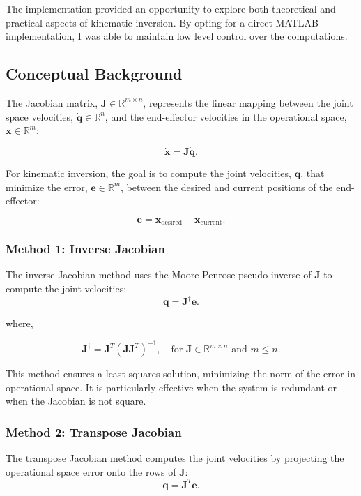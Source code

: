 \documentclass[12pt]{report}
\begin{document}
		The implementation provided an opportunity to explore both theoretical and practical aspects of kinematic inversion. By opting for a direct MATLAB implementation, I was able to maintain low level control over the computations.
	
			\addtocounter{section}{5} 
		\addtocounter{subsection}{0}
		\subsection{Conceptual Background}
The Jacobian matrix, \(\mathbf{J} \in \mathbb{R}^{m \times n}\), represents the linear mapping between the joint space velocities, \(\dot{\mathbf{q}} \in \mathbb{R}^n\), and the end-effector velocities in the operational space, \(\dot{\mathbf{x}} \in \mathbb{R}^m\):

\[
\dot{\mathbf{x}} = \mathbf{J} \dot{\mathbf{q}}.
\]

For kinematic inversion, the goal is to compute the joint velocities, \(\dot{\mathbf{q}}\), that minimize the error, \(\mathbf{e} \in \mathbb{R}^m\), between the desired and current positions of the end-effector:

\[
\mathbf{e} = \mathbf{x}_{\text{desired}} - \mathbf{x}_{\text{current}}.
\]

	
		\subsubsection{Method 1: Inverse Jacobian}
		
		The inverse Jacobian method uses the Moore-Penrose pseudo-inverse of \(\mathbf{J}\) to compute the joint velocities:
	\[
	\dot{\mathbf{q}} = \mathbf{J}^\dagger \mathbf{e}.
	\]
	
		
		where,
		
		\[
		\mathbf{J}^\dagger = \mathbf{J}^T (\mathbf{J} \mathbf{J}^T)^{-1}, \quad \text{for } \mathbf{J} \in \mathbb{R}^{m \times n} \text{ and } m \leq n.
		\]
		
		This method ensures a least-squares solution, minimizing the norm of the error in operational space. It is particularly effective when the system is redundant or when the Jacobian is not square.
		
		\subsubsection{Method 2: Transpose Jacobian}
		
		The transpose Jacobian method computes the joint velocities by projecting the operational space error onto the rows of \(\mathbf{J}\):
\begin{equation}
	\dot{\mathbf{q}} = \mathbf{J}^T \mathbf{e}.
\end{equation}
\end{document}
